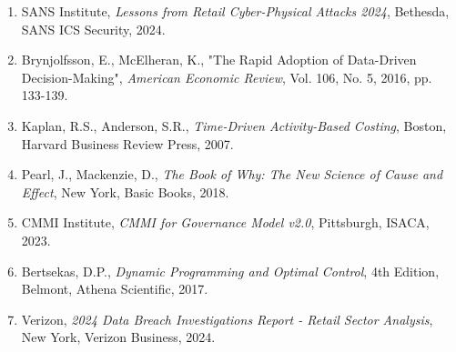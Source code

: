 \begin{enumerate}
\item SANS Institute, \textit{Lessons from Retail Cyber-Physical Attacks 2024}, Bethesda, SANS ICS Security, 2024.

\item Brynjolfsson, E., McElheran, K., "The Rapid Adoption of Data-Driven Decision-Making", \textit{American Economic Review}, Vol. 106, No. 5, 2016, pp. 133-139.

\item Kaplan, R.S., Anderson, S.R., \textit{Time-Driven Activity-Based Costing}, Boston, Harvard Business Review Press, 2007.

\item Pearl, J., Mackenzie, D., \textit{The Book of Why: The New Science of Cause and Effect}, New York, Basic Books, 2018.

\item CMMI Institute, \textit{CMMI for Governance Model v2.0}, Pittsburgh, ISACA, 2023.

\item Bertsekas, D.P., \textit{Dynamic Programming and Optimal Control}, 4th Edition, Belmont, Athena Scientific, 2017.

\item Verizon, \textit{2024 Data Breach Investigations Report - Retail Sector Analysis}, New York, Verizon Business, 2024.
\end{enumerate}